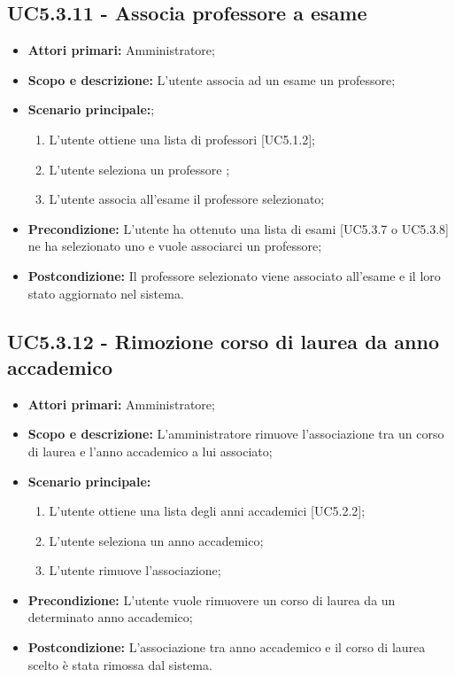 \documentclass[AnalisiDeiRequisiti.tex]{subfiles}
\begin{document}
\subsection{UC5.3.11 - Associa professore a esame}
\begin{itemize}
	\item \textbf{Attori primari:} Amministratore;
	\item \textbf{Scopo e descrizione:} L'utente associa ad un esame un professore;
	\item \textbf{Scenario principale:};
	\begin{enumerate}
		\item L'utente ottiene una lista di professori [UC5.1.2];
		\item L'utente seleziona un professore ;
		\item L'utente associa all'esame il professore selezionato;
	\end{enumerate}
	\item \textbf{Precondizione:} L'utente ha ottenuto una lista di esami [UC5.3.7 o UC5.3.8] ne ha selezionato uno e vuole associarci un professore; 
	\item \textbf{Postcondizione:} Il professore selezionato viene associato all'esame e il loro stato aggiornato nel sistema.
\end{itemize}
\subsection{UC5.3.12 - Rimozione corso di laurea da anno accademico}
\begin{itemize}
	\item \textbf{Attori primari:} Amministratore;
	\item \textbf{Scopo e descrizione:} L'amministratore rimuove l'associazione tra un corso di laurea e l'anno accademico a lui associato;
	\item \textbf{Scenario principale:}
	\begin{enumerate}
		\item L'utente ottiene una lista degli anni accademici [UC5.2.2];
		\item L'utente seleziona un anno accademico;
		\item L'utente rimuove l'associazione;
	\end{enumerate}
	\item \textbf{Precondizione:} L'utente vuole rimuovere un corso di laurea da un determinato anno accademico; 
	\item \textbf{Postcondizione:} L'associazione tra anno accademico e il corso di laurea scelto è stata rimossa dal sistema.
\end{itemize}
\end{document}
